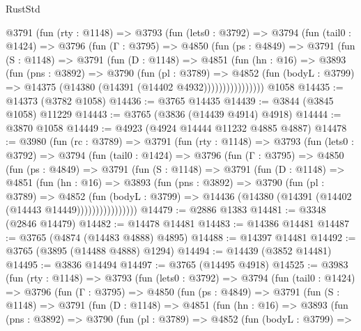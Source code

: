 \begin{lexlean}{RustStd}
\begin{coremodule}
      @3791
        (fun (rty : @1148) =>
        @3793
          (fun (lets0 : @3792) =>
          @3794
            (fun (tail0 : @1424) =>
            @3796
              (fun (Γ : @3795) =>
              @4850
                (fun (ps : @4849) =>
                @3791
                  (fun (S : @1148) =>
                  @3791
                    (fun (D : @1148) =>
                    @4851
                      (fun (hn : @16) =>
                      @3893
                        (fun (pns : @3892) =>
                        @3790
                          (fun (pl : @3789) =>
                          @4852
                            (fun (bodyL : @3799) =>
                            @14375 (@14380 (@14391 (@14402 @4932))))))))))))))))
    @1058
@14435 := @14373 (@3782 @1058)
@14436 := @3765 @14435
@14439 := @3844 (@3845 @1058) @11229
@14443 := @3765 (@3836 (@14439 @4914) @4918)
@14444 := @3870 @1058
@14449 := @4923 (@4924 @14444 @11232 @4885 @4887)
@14478 := @3980
    (fun (rc : @3789) =>
    @3791
      (fun (rty : @1148) =>
      @3793
        (fun (lets0 : @3792) =>
        @3794
          (fun (tail0 : @1424) =>
          @3796
            (fun (Γ : @3795) =>
            @4850
              (fun (ps : @4849) =>
              @3791
                (fun (S : @1148) =>
                @3791
                  (fun (D : @1148) =>
                  @4851
                    (fun (hn : @16) =>
                    @3893
                      (fun (pns : @3892) =>
                      @3790
                        (fun (pl : @3789) =>
                        @4852
                          (fun (bodyL : @3799) =>
                          @14436 (@14380 (@14391 (@14402 (@14443 @14449))))))))))))))))
@14479 := @2886 @1383
@14481 := @3348 (@2846 @14479)
@14482 := @14478 @14481
@14483 := @14386 @14481
@14487 := @3765 (@4874 (@14483 @4888) @4895)
@14488 := @14397 @14481
@14492 := @3765 (@3895 (@14488 @4888) @1294)
@14494 := @14439 (@3852 @14481)
@14495 := @3836 @14494
@14497 := @3765 (@14495 @4918)
@14525 := @3983
    (fun (rty : @1148) =>
    @3793
      (fun (lets0 : @3792) =>
      @3794
        (fun (tail0 : @1424) =>
        @3796
          (fun (Γ : @3795) =>
          @4850
            (fun (ps : @4849) =>
            @3791
              (fun (S : @1148) =>
              @3791
                (fun (D : @1148) =>
                @4851
                  (fun (hn : @16) =>
                  @3893
                    (fun (pns : @3892) =>
                    @3790
                      (fun (pl : @3789) =>
                      @4852
                        (fun (bodyL : @3799) =>

\end{coremodule}
\end{lexlean}

